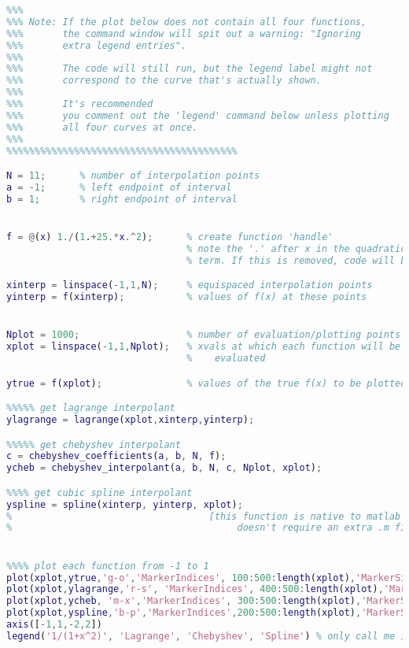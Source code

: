 \documentclass{article}
\begin{document}
\begin{lstlisting}[language=matlab]
%%%%%%%%%%%%%%%%%%%%%%%%%%%%%%%%%%%%%%%%%
%%%
%%% Note: If the plot below does not contain all four functions,
%%%       the command window will spit out a warning: "Ignoring
%%%       extra legend entries". 
%%%
%%%       The code will still run, but the legend label might not 
%%%       correspond to the curve that's actually shown. 
%%%
%%%       It's recommended
%%%       you comment out the 'legend' command below unless plotting
%%%       all four curves at once. 
%%%
%%%%%%%%%%%%%%%%%%%%%%%%%%%%%%%%%%%%%%%%%

N = 11;      % number of interpolation points
a = -1;      % left endpoint of interval
b = 1;       % right endpoint of interval


f = @(x) 1./(1.+25.*x.^2);      % create function 'handle'
                                % note the '.' after x in the quadratic
                                % term. If this is removed, code will break

xinterp = linspace(-1,1,N);     % equispaced interpolation points
yinterp = f(xinterp);           % values of f(x) at these points


Nplot = 1000;                   % number of evaluation/plotting points
xplot = linspace(-1,1,Nplot);   % xvals at which each function will be 
                                %    evaluated

ytrue = f(xplot);               % values of the true f(x) to be plotted

%%%%% get lagrange interpolant
ylagrange = lagrange(xplot,xinterp,yinterp);

%%%%% get chebyshev interpolant
c = chebyshev_coefficients(a, b, N, f);
ycheb = chebyshev_interpolant(a, b, N, c, Nplot, xplot);

%%%% get cubic spline interpolant
yspline = spline(xinterp, yinterp, xplot);
%                                   [this function is native to matlab and
%                                        doesn't require an extra .m file]


%%%% plot each function from -1 to 1
plot(xplot,ytrue,'g-o','MarkerIndices', 100:500:length(xplot),'MarkerSize',8); hold on; 
plot(xplot,ylagrange,'r-s', 'MarkerIndices', 400:500:length(xplot),'MarkerSize',8); hold on; 
plot(xplot,ycheb, 'm-x','MarkerIndices', 300:500:length(xplot),'MarkerSize',8); hold on; 
plot(xplot,yspline,'b-p','MarkerIndices',200:500:length(xplot),'MarkerSize',8); hold on; 
axis([-1,1,-2,2])
legend('1/(1+x^2)', 'Lagrange', 'Chebyshev', 'Spline') % only call me if all four curves are plotted
\end{lstlisting}
\end{document}
